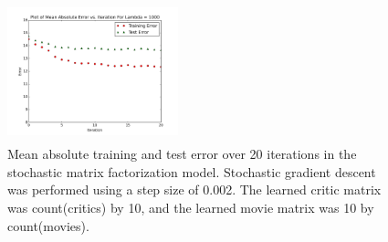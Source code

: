 \documentclass[10.5pt]{article}
\newcommand{\factwidth}{0.44}
\newcommand{\factheight}{1.6in}
\begin{document}
\begin{figure}[H]
\includegraphics[width=0\factwidth\textwidth,height=\factheight]{matrix_plots/test-i40d10l1000.png}
\caption{Mean absolute training and test error over 20 iterations in the stochastic matrix factorization model. Stochastic gradient descent was performed using a step size of 0.002. The learned critic matrix was count(critics) by 10, and the learned movie matrix was 10 by count(movies).}
\label{fig:fac-d10}
\end{figure}
\end{document}
